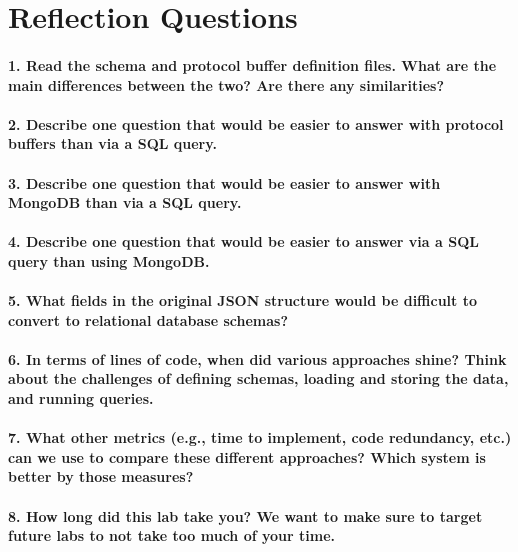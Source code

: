 \documentclass[12pt]{article}
\let\oldsection\section
\renewcommand\section{\clearpage\oldsection}
\begin{document}


\section*{Reflection Questions}

\paragraph{1. Read the schema and protocol buffer definition files. What are the main differences between the two? Are there any similarities?}
\paragraph{2. Describe one question that would be easier to answer with protocol buffers than via a SQL query.}
\paragraph{3. Describe one question that would be easier to answer with MongoDB than via a SQL query.}
\paragraph{4. Describe one question that would be easier to answer via a SQL query than using MongoDB.}
\paragraph{5. What fields in the original JSON structure would be difficult to convert to relational database schemas?}
\paragraph{6. In terms of lines of code, when did various approaches shine? Think about the challenges of defining schemas, loading and storing the data, and running queries.}
\paragraph{7. What other metrics (e.g., time to implement, code redundancy, etc.) can we use to compare these different approaches? Which system is better by those measures?}
\paragraph{8. How long did this lab take you? We want to make sure to target future labs to not take too much of your time.}
\end{document}
